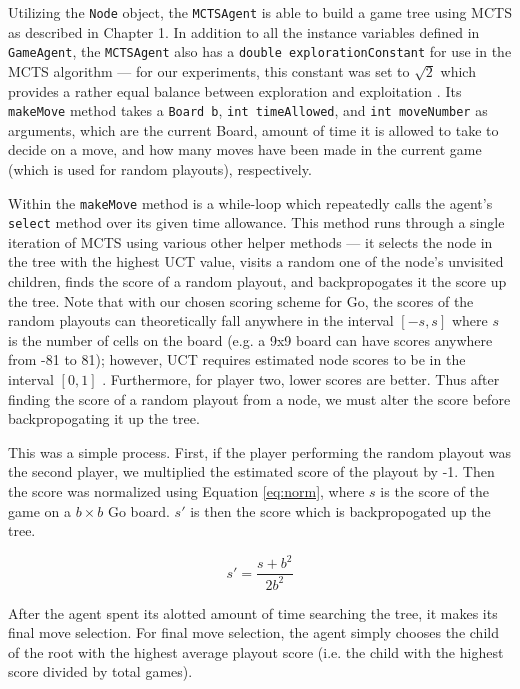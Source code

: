 Utilizing the \texttt{Node} object, the \texttt{MCTSAgent} is able to build a game tree using MCTS as described in Chapter 1.  In addition to all the instance variables defined in \texttt{GameAgent}, the \texttt{MCTSAgent} also has a \texttt{double explorationConstant} for use in the MCTS algorithm --- for our experiments, this constant was set to $\sqrt{2}$ which provides a rather equal balance between exploration and exploitation \cite{browne2012survey}.  Its \texttt{makeMove} method takes a \texttt{Board b}, \texttt{int timeAllowed}, and  \texttt{int moveNumber} as arguments, which are the current Board, amount of time it is allowed to take to decide on a move, and how many moves have been made in the current game (which is used for random playouts), respectively.

Within the \texttt{makeMove} method is a while-loop which repeatedly calls the agent's \texttt{select} method over its given time allowance.  This method runs through a single iteration of MCTS using various other helper methods --- it selects the node in the tree with the highest UCT value, visits a random one of the node's unvisited children, finds the score of a random playout, and backpropogates it the score up the tree.  Note that with our chosen scoring scheme for Go, the scores of the random playouts can theoretically fall anywhere in the interval $[-s, s]$ where $s$ is the number of cells on the board (e.g. a 9x9 board can have scores anywhere from -81 to 81); however, UCT requires estimated node scores to be in the interval $[0,1]$ \cite{browne2012survey}.  Furthermore, for player two, lower scores are better.  Thus after finding the score of a random playout from a node, we must alter the score before backpropogating it up the tree.

This was a simple process.  First, if the player performing the random playout was the second player, we multiplied the estimated score of the playout by -1.  Then the score was normalized using Equation \ref{eq:norm}, where $s$ is the score of the game on a $b\times b$ Go board.  $s'$ is then the score which is backpropogated up the tree.

\begin{equation}\label{eq:norm}
s' = \frac{s + b^2}{2b^2}
\end{equation}

After the agent spent its alotted amount of time searching the tree, it makes its final move selection.  For final move selection, the agent simply chooses the child of the root with the highest average playout score (i.e. the child with the highest score divided by total games).

